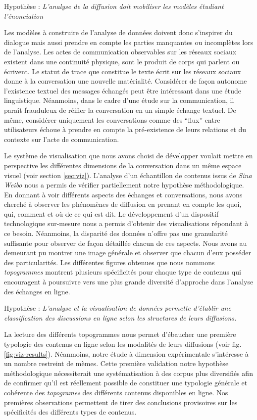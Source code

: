 Hypothèse : \textit{L'analyse de la diffusion doit mobiliser les modèles étudiant l'énonciation} 

Les modèles à construire de l'analyse de données doivent donc s'inspirer du dialogue mais aussi prendre en compte les parties manquantes ou incomplètes lors de l'analyse. Les actes de communication observables sur les réseaux sociaux existent dans une continuité physique, sont le produit de corps qui parlent ou écrivent. Le statut de trace que constitue le texte écrit sur les réseaux sociaux donne à la conversation une nouvelle matérialité. Considérer de façon autonome l'existence textuel des messages échangés peut être intéressant dans une étude linguistique. Néanmoins, dans le cadre d'une étude sur la communication, il paraît frauduleux de réifier la conversation en un simple échange textuel. De même, considérer uniquement les conversations comme des ``flux'' entre utilisateurs échoue à prendre en compte la pré-existence de leurs relations et du contexte sur l'acte de communication. 

Le système de visualisation que nous avons choisi de développer voulait mettre en perspective les différentes dimensions de la conversation dans un même espace visuel (voir section \ref{sec:viz}). L'analyse d'un échantillon de contenus issus de \textit{Sina Weibo} nous a permis de vérifier partiellement notre hypothèse méthodologique. En donnant à voir différents aspects des échanges et conversations, nous avons cherché à observer les phénomènes de diffusion en prenant en compte les quoi, qui, comment et où de ce qui est dit. Le développement d'un dispositif technologique sur-mesure nous a permis d'obtenir des visualisations répondant à ce besoin. Néanmoins, la disparité des données n'offre pas une granularité suffisante pour observer de façon détaillée chacun de ces aspects. Nous avons au demeurant pu montrer une image générale et observer que chacun d'eux posséder des particularités. Les différentes figures obtenues que nous nommons \textit{topogrammes} montrent plusieurs spécificités pour chaque type de contenus qui encouragent à poursuivre vers une plus grande diversité d'approche dans l'analyse des échanges en ligne.

Hypothèse : \textit{L'analyse et la visualisation de données permette d'établir une classification des discussions en ligne selon les structures de leurs diffusions.}


La lecture des différents topogrammes nous permet d'ébaucher une première typologie des contenus en ligne selon les modalités de leurs diffusions (voir fig. \ref{fig:viz-results}). Néanmoins, notre étude à dimension expérimentale s'intéresse à un nombre restreint de mèmes. Cette première validation notre hypothèse méthodologique nécessiterait une systématisation à des corpus plus diversifiés afin de confirmer qu'il est réellement possible de constituer une typologie générale et cohérente des \textit{topogrames} des différents contenus disponibles en ligne. Nos premières observations permettent de tirer des conclusions provisoires sur les spécificités des différents types de contenus.

